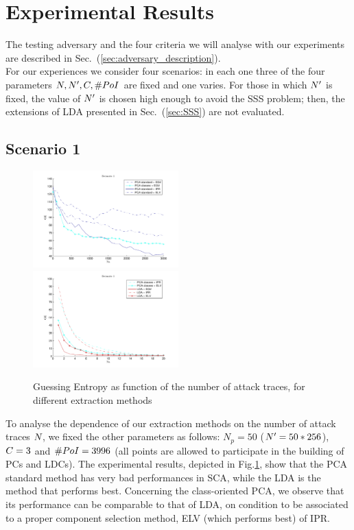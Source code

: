 \section{Experimental Results}

The testing adversary and the four criteria we will analyse with our experiments are described in Sec.~(\ref{sec:adversary_description}). \\
For our experiences we consider four scenarios: in each one three of the four parameters $\numTraces[], \numTraces[]', \newTraceLength, \numPoI$ are fixed and one varies. For those in which $\numTraces[]'$ is fixed, the value of $\numTraces[]'$ is chosen high enough to avoid the SSS problem; then, the extensions of LDA presented in Sec.~(\ref{sec:SSS}) are not evaluated.

\subsection{Scenario 1}
\begin{figure}
\includegraphics[width=0.5\textwidth]{figures/Criterion1.pdf}
\includegraphics[width=0.5\textwidth]{figures/Criterion1Good.pdf} 
\caption{Guessing Entropy as function of the number of attack traces, for different extraction methods}\label{fig:1}
\end{figure}
To analyse the dependence of our extraction methods on the number of attack traces $\numTraces[]$, we fixed the other parameters as follows: $N_p=50$ ($\numTraces[]'=50*256$), $\newTraceLength = 3$ and $\numPoI = 3996$ (all points are allowed to participate in the building of PCs and LDCs). The experimental results, depicted in Fig.\ref{fig:1}, show that the PCA standard method has very bad performances in SCA, while the LDA is the method that performs best. Concerning the class-oriented PCA, we observe that its performance can be comparable to that of LDA, on condition to be associated to a proper component selection method, ELV (which performs best) of IPR.  \\


